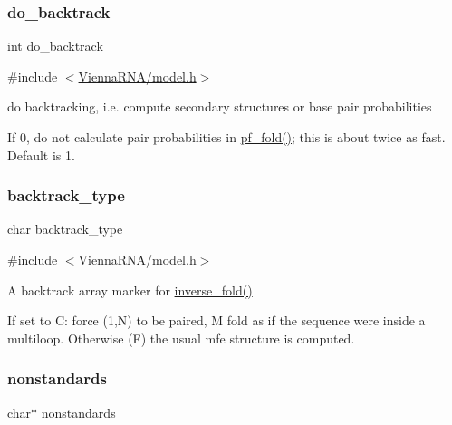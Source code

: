 \subsubsection{\texorpdfstring{do\_backtrack}{do\_backtrack}}
{\footnotesize\ttfamily int do\+\_\+backtrack}



{\ttfamily \#include $<$\mbox{\hyperlink{model_8h}{Vienna\+R\+N\+A/model.\+h}}$>$}



do backtracking, i.\+e. compute secondary structures or base pair probabilities 

If 0, do not calculate pair probabilities in \mbox{\hyperlink{group__part__func__global__deprecated_gadc3db3d98742427e7001a7fd36ef28c2}{pf\+\_\+fold()}}; this is about twice as fast. Default is 1. \mbox{\label{group__model__details_ga83bdb43472a259c71e69fa9f70f420c3}} 
\subsubsection{\texorpdfstring{backtrack\_type}{backtrack\_type}}
{\footnotesize\ttfamily char backtrack\+\_\+type}



{\ttfamily \#include $<$\mbox{\hyperlink{model_8h}{Vienna\+R\+N\+A/model.\+h}}$>$}



A backtrack array marker for \mbox{\hyperlink{group__inverse__fold_ga7af026de55d4babad879f2c92559cbbc}{inverse\+\_\+fold()}} 

If set to \textquotesingle{}C\textquotesingle{}\+: force (1,N) to be paired, \textquotesingle{}M\textquotesingle{} fold as if the sequence were inside a multiloop. Otherwise (\textquotesingle{}F\textquotesingle{}) the usual mfe structure is computed. \mbox{\label{group__model__details_ga2695d91cc535d09c2eae5c3884e2ec64}} 
\subsubsection{\texorpdfstring{nonstandards}{nonstandards}}
{\footnotesize\ttfamily char$\ast$ nonstandards}



